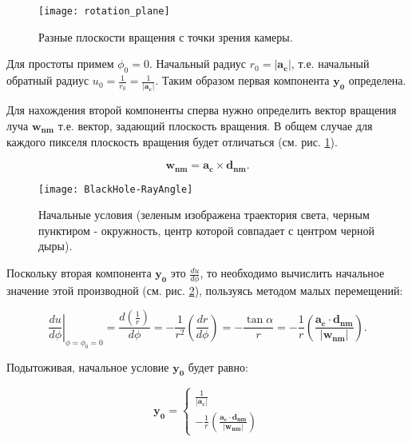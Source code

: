 \newpage

\begin{figure}[h]
    \centering
    \texttt{[image: rotation\_plane]}
    \caption{Разные плоскости вращения с точки зрения камеры.}
    \label{fig:rotation_plane}
\end{figure}

Для простоты примем $\phi_0 = 0$. Начальный радиус $r_0 = |\mathbf{a_c}|$, т.е. начальный обратный радиус $u_0 = \frac{1}{r_0} = \frac{1}{|\mathbf{a_c}|}$. Таким образом первая компонента $\mathbf{y_0}$ определена.

Для нахождения второй компоненты сперва нужно определить вектор вращения луча $\mathbf{w_{nm}}$ т.е. вектор, задающий плоскость вращения. В общем случае для каждого пикселя плоскость вращения будет отличаться (см. рис. \ref{fig:rotation_plane}).

\begin{equation}
\label{eq:w_ray}
    \mathbf{w_{nm}} = \mathbf{a_c} \times \mathbf{d_{nm}}.
\end{equation}

\newpage

\begin{figure}[h]
    \centering
    \texttt{[image: BlackHole-RayAngle]}
    \caption{Начальные условия (зеленым изображена траектория света, черным пунктиром - окружность, центр которой совпадает с центром черной дыры).}
    \label{fig:blackhole_rayAngle}
\end{figure}

Поскольку вторая компонента $\mathbf{y_0}$ это $\frac{du}{d\phi}$, то необходимо вычислить начальное значение этой производной (см. рис. \ref{fig:blackhole_rayAngle}), пользуясь методом малых перемещений:

\begin{equation}
\label{eq:dudr_init}
    \left.\frac{du}{d\phi}\right|_{\phi=\phi_0=0} = \frac{d\left(\frac{1}{r}\right)}{d\phi} = -\frac{1}{r^2}\left(\frac{dr}{d\phi}\right) = -\frac{\tan{\alpha}}{r} = -\frac{1}{r}\left(\frac{\mathbf{a_c} \cdot \mathbf{d_{nm}}}{\left|\mathbf{w_{nm}}\right|}\right).
\end{equation}

Подытоживая, начальное условие $\mathbf{y_0}$ будет равно:

\begin{equation}
\label{eq:runge-kutte_y0}
    \mathbf{y_0} =
    \begin{cases}
        \frac{1}{\left|\mathbf{a_c}\right|}
        \\
        -\frac{1}{r}\left(\frac{\mathbf{a_c} \cdot \mathbf{d_{nm}}}{\left|\mathbf{w_{nm}}\right|}\right)
    \end{cases}
\end{equation}

